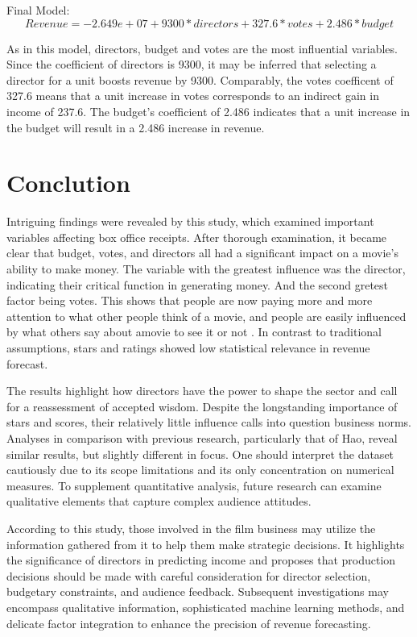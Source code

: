 \documentclass[12pt]{article}
\begin{document}
Final Model: 
\begin{equation}
Revenue = -2.649e+07 +9300*directors + 327.6*votes + 2.486*budget
\end{equation}

As in this model, directors, budget and votes are the most influential variables.
Since the coefficient of directors is 9300, it may be inferred that selecting a 
director for a unit boosts revenue by 9300. Comparably, the votes coefficent of 
327.6 means that a unit increase in votes corresponds to an indirect gain in income 
of 237.6. The budget's coefficient of 2.486 indicates that a unit increase in the 
budget will result in a 2.486 increase in revenue.

\section{Conclution}
\label{sec:con}

Intriguing findings were revealed by this study, which examined important variables 
affecting box office receipts. After thorough examination, it became clear that budget, 
votes, and directors all had a significant impact on a movie's ability to make money. 
The variable with the greatest influence was the director, indicating their critical 
function in generating money. And the second gretest factor being votes. This shows 
that people are now paying more and more attention to what other people think of a movie, 
and people are easily influenced by what others say about amovie to see it or not \citep{2}. 
In contrast to traditional assumptions, stars and ratings showed low statistical relevance in revenue forecast.

The results highlight how directors have the power to shape the sector and call for
a reassessment of accepted wisdom. Despite the longstanding importance of stars and 
scores, their relatively little influence calls into question business norms. Analyses 
in comparison with previous research, particularly that of Hao, reveal similar results, 
but slightly different in focus. One should interpret the dataset cautiously due to its 
scope limitations and its only concentration on numerical measures. To supplement 
quantitative analysis, future research can examine qualitative elements that capture 
complex audience attitudes.

According to this study, those involved in the film business may utilize the information 
gathered from it to help them make strategic decisions. It highlights the significance of 
directors in predicting income and proposes that production decisions should be made with 
careful consideration for director selection, budgetary constraints, and audience feedback.
Subsequent investigations may encompass qualitative information, sophisticated machine 
learning methods, and delicate factor integration to enhance the precision of revenue forecasting.



\end{document}
